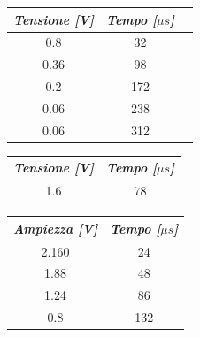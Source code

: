     \begin{table} [!ht]
        \begin{minipage}{.34\linewidth}
            \centering
            \begin{tabular}{|c|c|c|}
                \hline
                \textit{Tensione [V]} & \textit{Tempo [$\mu s$]} \\
                \hline
                0.8 & 32 \\
                \hline
                0.36 & 98 \\
                \hline
                0.2 & 172 \\
                \hline
                0.06 & 238 \\
                \hline
                0.06 & 312 \\
                \hline
            \end{tabular}
        \end{minipage}
        \begin{minipage}{.34\linewidth}
            \centering
            \begin{tabular}{|c|c|}
                \hline
                \textit{Tensione [V]} & \textit{Tempo [$\mu s$]} \\
                \hline
                1.6 & 78 \\            
                \hline
            \end{tabular}
        \end{minipage}
        \begin{minipage}{.34\linewidth}
            \centering
            \begin{tabular}{|c|c|}
                \hline
                \textit{Ampiezza [V]} & \textit{Tempo [$\mu s$]} \\
                \hline
                2.160 & 24 \\ 
                \hline
                1.88 & 48 \\
                \hline
                1.24 & 86 \\
                \hline
                0.8 & 132 \\         
                \hline
            \end{tabular}
        \end{minipage}
    \end{table}


